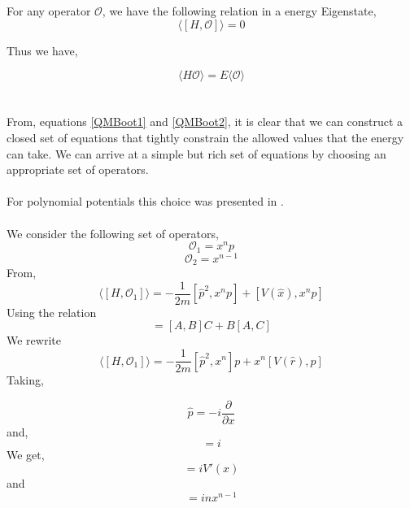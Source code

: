 \documentclass{article}
\theoremstyle{definition}
\begin{document}
For any operator $\mathcal{O}$, we have the following relation in a energy Eigenstate,
\begin{equation}\label{QMBoot1}
\langle [H,\mathcal{O}] \rangle = 0
\end{equation}

Thus we have, 

\begin{equation}\label{QMBoot2}
\langle H\mathcal{O} \rangle = E\langle \mathcal{O} \rangle
\end{equation}
\\
\\
From, equations \eqref{QMBoot1} and \eqref{QMBoot2}, it is clear that we can construct a closed set of equations that tightly constrain the allowed values that the energy can take. We can arrive at a simple but rich set of equations by choosing an appropriate set of operators. \\
\\
For polynomial potentials this choice was presented in \cite{Berenstein:2021dyf}. \\
\\
We consider the following set of operators, 
\begin{equation*}
    \mathcal{O}_{1} = x^{n}p
\end{equation*}
\begin{equation*}
    \mathcal{O}_{2} = x^{n-1}
\end{equation*}
From, 
\begin{equation}
    \langle [H,\mathcal{O}_{1}] \rangle = -\frac{1}{2m}[\hat{p}^{2},x^{n}p] + [V(\hat{x}),x^{n}p]
\end{equation}
Using the relation
\begin{equation}
    [A,BC] = [A,B]C + B[A,C] 
\end{equation}
We rewrite 
\begin{equation}
    \langle [H,\mathcal{O}_{1}] \rangle = -\frac{1}{2m}[\hat{p}^{2},x^{n}]p + x^{n}[V(\hat{r}),p]
\end{equation}
Taking, 

\begin{equation}
    \hat{p} = -i \frac{\partial}{\partial x}
\end{equation}
and,
\begin{equation}
   [\hat{x},\hat{p}] = i
\end{equation}
We get, 
\begin{equation}
   [V(\hat{x}),\hat{p}] = iV'(x)
\end{equation}
and
\begin{equation}
   [\hat{x}^{n},\hat{p}] = i n x^{n-1} 
\end{equation}
\end{document}
